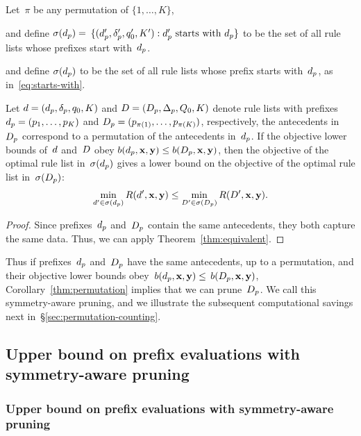 \begin{corollary}
\label{thm:permutation}
Let~$\pi$ be any permutation of ${\{1, \dots, K\}}$,
\begin{arxiv}
and define ${\sigma(d_p) = }$
${\{(d_p', \delta_p', q_0', K') : d_p' \textnormal{ starts with } d_p \}}$
to be the set of all rule lists whose prefixes start with~$d_p$.
\end{arxiv}
\begin{kdd}
and define $\sigma(d_p)$
to be the set of all rule lists whose prefix starts with~$d_p$,
as in~\eqref{eq:starts-with}.
\end{kdd}
%
Let ${{d} = (d_p, \delta_p, q_0, K)}$
and ${{D} = (D_p, \Delta_p, Q_0, K)}$
denote rule lists with prefixes ${d_p = (p_1, \dots, p_K)}$
and ${D_p = (p_{\pi(1)}, \dots, p_{\pi(K)})}$,
respectively, \ie the antecedents in~$D_p$
correspond to a permutation of the antecedents in~$d_p$.
%
If the objective lower bounds of~${d}$ and~${D}$
obey ${b(d_p, \mathbf{x}, \mathbf{y}) \le b(D_p, \mathbf{x}, \mathbf{y})}$,
then the objective of the optimal rule list in~$\sigma(d_p)$ gives a
lower bound on the objective of the optimal rule list in~$\sigma(D_p)$:
\begin{align}
\min_{{d}' \in \sigma(d_p)} R({d}', \mathbf{x}, \mathbf{y})
\le \min_{{D}' \in \sigma(D_p)} R({D}', \mathbf{x}, \mathbf{y}).
\label{eq:permutation}
\end{align}
\end{corollary}

\begin{arxiv}
\begin{proof}
Since prefixes~$d_p$ and~$D_p$ contain
the same antecedents, they both capture the same data.
Thus, we can apply Theorem~\ref{thm:equivalent}.
\end{proof}
\end{arxiv}

Thus if prefixes~$d_p$ and~$D_p$ have the same antecedents,
up to a permutation, and their objective lower bounds
obey~${b(d_p, \mathbf{x}, \mathbf{y}) \le}$ ${b(D_p, \mathbf{x}, \mathbf{y})}$,
Corollary~\ref{thm:permutation} implies that we can prune~$D_p$.
%
We call this %
symmetry-aware pruning,
and we illustrate the subsequent
computational savings next in~\S\ref{sec:permutation-counting}.

\begin{arxiv}
\subsection{Upper bound on prefix evaluations with symmetry-aware pruning}
\end{arxiv}
\begin{kdd}
\subsubsection{Upper bound on prefix evaluations with symmetry-aware pruning}
\end{kdd}
\label{sec:permutation-counting}

